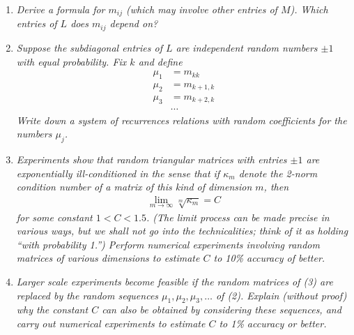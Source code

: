\documentclass[a4paper,oneside]{book}
\numberwithin{equation}{chapter}
\begin{document}
\begin{enumerate}
\item \textit{Derive a formula for $m_{ij}$ (which may involve other entries of $M$). Which entries of $L$ does $m_{ij}$ depend on?}
\item \textit{Suppose the subdiagonal entries of $L$ are independent random numbers $\pm 1$ with equal probability. Fix $k$ and define}
\begin{align}
{\mu _1} &= {m_{kk}}\\
{\mu _2} &= {m_{k + 1,k}}\\
{\mu _3} &= {m_{k + 2,k}}\\
 &\cdots 
\end{align}
\textit{Write down a system of recurrences relations with random coefficients for the numbers $\mu _j$.}
\item \textit{Experiments show that random triangular matrices with entries $\pm 1$ are exponentially ill-conditioned in the sense that if $\kappa _m$ denote the 2-norm condition number of a matrix of this kind of dimension $m$, then}
\begin{align}
\mathop {\lim }\limits_{m \to \infty } \sqrt[m]{{{\kappa _m}}} = C
\end{align}
\textit{for some constant $1<C<1.5$. (The limit process can be made precise in various ways, but we shall not go into the technicalities; think of it as holding ``with probability 1.'') Perform numerical experiments involving random matrices of various dimensions to estimate $C$ to 10\% accuracy of better.}
\item \textit{Larger scale experiments become feasible if the random matrices of (3) are replaced by the random sequences $\mu _1,\mu_2,\mu _3,\ldots $ of (2). Explain (without proof) why the constant $C$ can also be obtained by considering these sequences, and carry out numerical experiments to estimate $C$ to 1\% accuracy or better.}
\end{enumerate}
\end{document}
